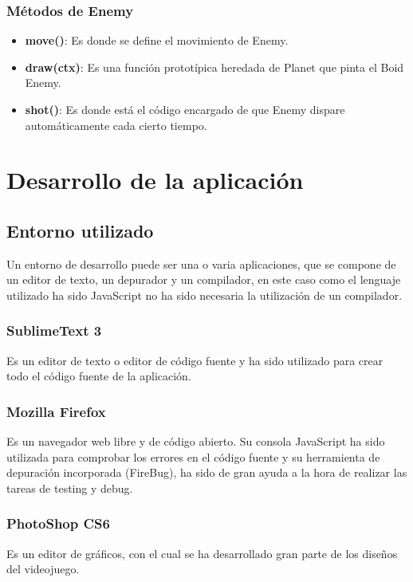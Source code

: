\documentclass[a4paper,10pt]{article}
\begin{document}
\subsubsection{Métodos de Enemy}
\begin{itemize}
 \item \textbf{move()}: Es donde se define el movimiento de Enemy.
 \item \textbf{draw(ctx)}: Es una función prototípica heredada de Planet que pinta el Boid Enemy.
 \item \textbf{shot()}: Es donde está el código encargado de que Enemy dispare automáticamente cada cierto tiempo.
\end{itemize}
\cleardoublepage

\section{Desarrollo de la aplicación}
\subsection{Entorno utilizado}
Un entorno de desarrollo puede ser una o varia aplicaciones, 
que se compone de un editor de texto, un depurador y un compilador, 
en este caso como el lenguaje utilizado ha sido JavaScript no ha sido 
necesaria la utilización de un compilador.

\subsubsection{SublimeText 3}
Es un editor de texto o editor de código fuente y 
ha sido utilizado para crear todo el código fuente de la aplicación.

\subsubsection{Mozilla Firefox}
Es un navegador web libre y de código abierto. 
Su consola JavaScript ha sido utilizada para comprobar los 
errores en el código fuente y su herramienta de depuración 
incorporada (FireBug), ha sido de gran ayuda a la hora de realizar las tareas de 
testing y debug.

\subsubsection{PhotoShop CS6}
Es un editor de gráficos, con el cual se ha desarrollado 
gran parte de los diseños del videojuego.
\end{document}
